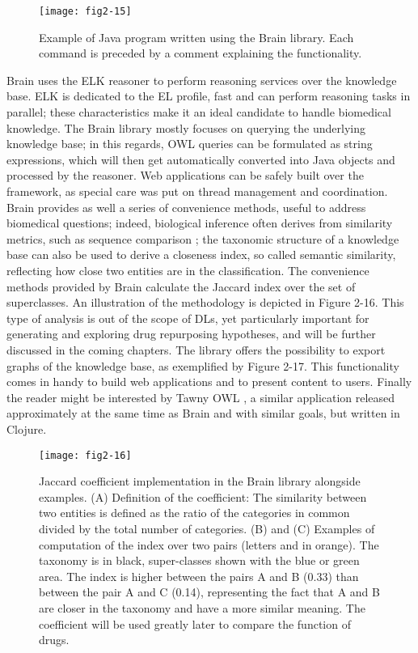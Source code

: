 \begin{figure}[ht]
    \centering
    \texttt{[image: fig2-15]}
    \caption{Example of Java program written using the Brain library. Each command is preceded by a comment explaining the functionality.}
    \label{fig2-15}
\end{figure}

Brain uses the ELK reasoner \citep{kazakov2013incredible} to perform reasoning services over the knowledge base. ELK is dedicated to the EL profile, fast \citep{gonccalves2013owl} and can perform reasoning tasks in parallel; these characteristics make it an ideal candidate to handle biomedical knowledge. The Brain library mostly focuses on querying the underlying knowledge base; in this regards, OWL queries can be formulated as string expressions, which will then get automatically converted into Java objects and processed by the reasoner. Web applications can be safely built over the framework, as special care was put on thread management and coordination. Brain provides as well a series of convenience methods, useful to address biomedical questions; indeed, biological inference often derives from similarity metrics, such as sequence comparison \citep{stevens2007using}; the taxonomic structure of a knowledge base can also be used to derive a closeness index, so called semantic similarity, reflecting how close two entities are in the classification. The convenience methods provided by Brain calculate the Jaccard index over the set of superclasses. An illustration of the methodology is depicted in Figure 2-16. This type of analysis is out of the scope of DLs, yet particularly important for generating and exploring drug repurposing hypotheses, and will be further discussed in the coming chapters. The library offers the possibility to export graphs of the knowledge base, as exemplified by Figure 2-17. This functionality comes in handy to build web applications and to present content to users. Finally the reader might be interested by Tawny OWL \citep{lord2013semantic}, a similar application released approximately at the same time as Brain and with similar goals, but written in Clojure.

\begin{figure}[ht]
    \centering
    \texttt{[image: fig2-16]}
    \caption{Jaccard coefficient implementation in the Brain library alongside examples. (A) Definition of the coefficient: The similarity between two entities is defined as the ratio of the categories in common divided by the total number of categories. (B) and (C) Examples of computation of the index over two pairs (letters and in orange). The taxonomy is in black, super-classes shown with the blue or green area. The index is higher between the pairs A and B (0.33) than between the pair A and C (0.14), representing the fact that A and B are closer in the taxonomy and have a more similar meaning.  The coefficient will be used greatly later to compare the function of drugs.}
    \label{fig2-16}
\end{figure}

